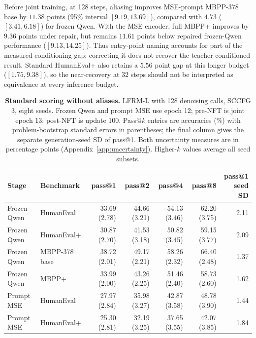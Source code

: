 \documentclass{article}
\begin{document}
Before joint training, at 128 steps, aliasing improves MSE-prompt MBPP-378 base by $11.38$ points (95\% interval $[9.19,13.69]$), compared with $4.73$ ($[3.41,6.18]$) for frozen Qwen. With the MSE encoder, full MBPP+ improves by $9.36$ points under repair, but remains $11.61$ points below repaired frozen-Qwen performance ($[9.13,14.25]$). Thus entry-point naming accounts for part of the measured conditioning gap; correcting it does not recover the teacher-conditioned result. Standard HumanEval+ also retains a $5.56$ point gap at this longer budget ($[1.75,9.38]$), so the near-recovery at 32 steps should not be interpreted as equivalence at every inference budget.

\begin{table}[htbp]
\centering\small
\setlength{\tabcolsep}{3pt}
\caption{\textbf{Standard scoring without aliases.} LFRM-L with 128 denoising calls, SCCFG 3, eight seeds. Frozen Qwen and prompt MSE use epoch 12; pre-NFT is joint epoch 13; post-NFT is update 100. Pass@$k$ entries are accuracies (\%) with problem-bootstrap standard errors in parentheses; the final column gives the separate generation-seed SD of pass@1. Both uncertainty measures are in percentage points (Appendix~\ref{app:uncertainty}). Higher-$k$ values average all seed subsets.}
\label{tab:codingstandarddetail}
\begin{tabular}{@{}llrrrrr@{}}
\toprule
Stage & Benchmark & pass@1 & pass@2 & pass@4 & pass@8 & \shortstack{pass@1\\seed SD}\\
\midrule
Frozen Qwen & HumanEval & 33.69 {\scriptsize (2.78)} & 44.66 {\scriptsize (3.21)} & 54.13 {\scriptsize (3.46)} & 62.20 {\scriptsize (3.75)} & 2.11\\
Frozen Qwen & HumanEval+ & 30.87 {\scriptsize (2.70)} & 41.53 {\scriptsize (3.18)} & 50.82 {\scriptsize (3.45)} & 59.15 {\scriptsize (3.77)} & 2.09\\
Frozen Qwen & MBPP-378 base & 38.72 {\scriptsize (2.01)} & 49.17 {\scriptsize (2.21)} & 58.26 {\scriptsize (2.32)} & 66.40 {\scriptsize (2.48)} & 1.37\\
Frozen Qwen & MBPP+ & 33.99 {\scriptsize (2.00)} & 43.26 {\scriptsize (2.25)} & 51.46 {\scriptsize (2.40)} & 58.73 {\scriptsize (2.60)} & 1.62\\
\midrule
Prompt MSE & HumanEval & 27.97 {\scriptsize (2.84)} & 35.98 {\scriptsize (3.27)} & 42.87 {\scriptsize (3.58)} & 48.78 {\scriptsize (3.90)} & 1.44\\
Prompt MSE & HumanEval+ & 25.30 {\scriptsize (2.81)} & 32.19 {\scriptsize (3.25)} & 37.65 {\scriptsize (3.55)} & 42.07 {\scriptsize (3.85)} & 1.84\\

\end{tabular}
\end{table}
\end{document}

